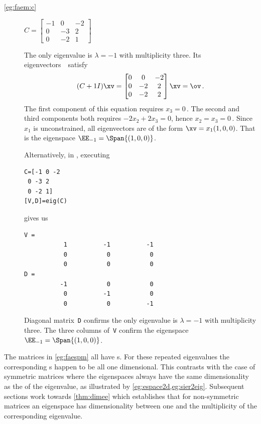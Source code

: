 \begin{example}
\begin{description}
\item[\ref{eg:faem:c}]
\(C=\begin{bmatrix}-1&0&-2
\\0&-3&2
\\0&-2&1\end{bmatrix}\)
\begin{solution} 
The only eigenvalue is \(\lambda=-1\) with multiplicity three.
Its eigenvectors~\xv\ satisfy
\begin{equation*}
(C+1 I)\xv=\begin{bmatrix} 0&0&-2
\\0&-2&2
\\0&-2&2 \end{bmatrix}\xv=\ov\,.
\end{equation*}
The first component of this equation requires \(x_3=0\)\,.  
The second and third components both requires \(-2x_2+2x_3=0\), hence \(x_2=x_3=0\)\,.
Since \(x_1\) is unconstrained, all eigenvectors are of the form \(\xv=x_1(1,0,0)\).  
That is the eigenspace  \(\EE_{-1}=\Span\{(1,0,0)\}\).

Alternatively, in \script, executing 
\begin{verbatim}
C=[-1 0 -2
 0 -3 2
 0 -2 1]
[V,D]=eig(C)
\end{verbatim}
gives us
\begin{verbatim}
V =
           1          -1          -1
           0           0           0
           0           0           0
D =
          -1           0           0
           0          -1           0
           0           0          -1
\end{verbatim}
Diagonal matrix~\verb|D| confirms the only eigenvalue is \(\lambda=-1\) with multiplicity three.  
The three columns of~\verb|V| confirm the eigenspace \(\EE_{-1}=\Span\{(1,0,0)\}\).
\end{solution}

\end{description}
\end{example}

The matrices in \autoref{eg:faespm} all have s.  
For these repeated eigenvalues the corresponding s happen to be all one dimensional.
This contrasts with the case of symmetric matrices where the 
eigenspaces always have the same dimensionality as the 
 of the eigenvalue, as illustrated by 
\cref{eg:espace2d,eg:sier2eig}.
Subsequent sections work towards \autoref{thm:dimee} which establishes that for non-symmetric matrices an eigenspace has dimensionality between one and the multiplicity of the corresponding eigenvalue.


